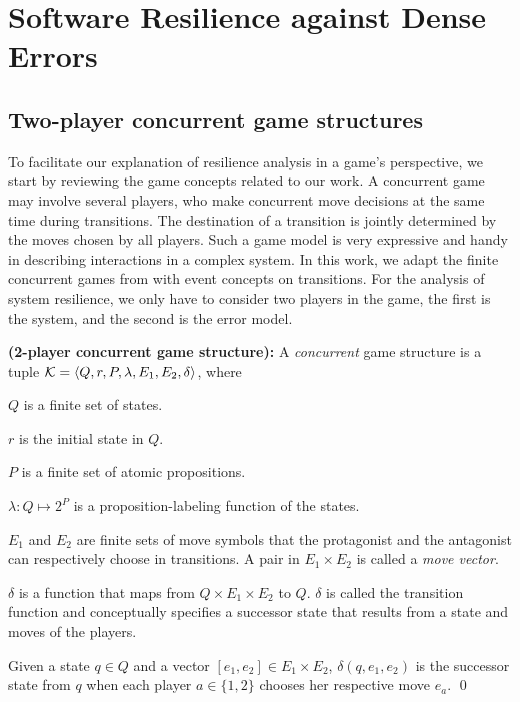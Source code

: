 \chapter{Software Resilience against Dense Errors}
\label{c:resilience}




\section{Two-player concurrent game structures}
To facilitate our explanation of resilience analysis in a game's 
perspective, 
we start by reviewing the game concepts related to our work. 
A concurrent game may involve several players\label{reply1.multiple.players}, who make concurrent move decisions at the same time during transitions. 
The destination of a transition is jointly determined by the moves chosen by all players.  
Such a game model is very expressive and handy in 
describing interactions in a complex system.  
In this work, we adapt the finite concurrent games from \cite{AHK02} 
with event concepts on transitions.  
For the analysis of system resilience, 
we only have to consider two players in the game, 
the first is the system, and the second is the error model. 


\begin{definition} \label{def.cncgame} 
{\bf (2-player concurrent game structure):}
A {\em concurrent} game structure is a tuple 
${\cal K}=\langle Q,r,P,\lambda,E_1,E_2,\delta\rangle$, where
\begin{list1}
\item $Q$ is a finite set of states. 
\item $r$ is the initial state in $Q$.  
\item $P$ is a finite set of atomic propositions. 
\item $\lambda:Q\mapsto 2^P$ is a proposition-labeling function of the states. 
\item $E_1$ and $E_2$ are finite sets of move symbols that the protagonist and 
the antagonist can respectively choose in transitions.  
A pair in $E_1\times E_2$ is called a {\em move vector}.  
\item $\delta$ is a function that maps 
  from $Q\times E_1\times E_2$ to $Q$.  
  $\delta$ is called the transition function and 
  conceptually specifies a successor state 
  that results from a state and moves of the players. 
\label{reply1.for.convenience.succ} 
\end{list1}
Given a state $q\in Q$ and a vector $[e_1,e_2]\in E_1\times E_2$, 
$\delta(q,e_1,e_2)$ is the successor state from 
$q$ when each player $a\in \{1,2\}$ chooses her respective move $e_a$.  
\qed 
\end{definition} 

